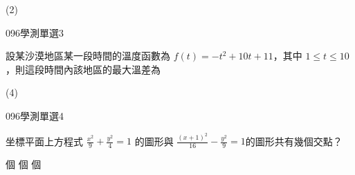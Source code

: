 \begin{QUESTIONS}
\begin{QUESTION}
        \begin{QANS}
            (2)
        \end{QANS}
        \begin{QSOLLIST}
        \end{QSOLLIST}
        \begin{QEMPTYSPACE}
        \end{QEMPTYSPACE}
    \end{QUESTION}
    \begin{QUESTION}
        \begin{ExamInfo}{096}{學測}{單選}{3}
        \end{ExamInfo}
        \begin{ExamAnsRateInfo}{58}{88}{62}{24}
        \end{ExamAnsRateInfo}
        \begin{QBODY}
			設某沙漠地區某一段時間的溫度函數為 $f(t) = -t^2 +10t +11$，其中 $1 \leq  t \leq 10$ ，則這段時間內該地區的最大溫差為
			\begin{QOPS} 
			\end{QOPS}
        \end{QBODY}
        \begin{QFROMS}
        \end{QFROMS}
        \begin{QTAGS}\end{QTAGS}
        \begin{QANS}
            (4)
        \end{QANS}
        \begin{QSOLLIST}
        \end{QSOLLIST}
        \begin{QEMPTYSPACE}
        \end{QEMPTYSPACE}
    \end{QUESTION}
    \begin{QUESTION}
        \begin{ExamInfo}{096}{學測}{單選}{4}
        \end{ExamInfo}
        \begin{ExamAnsRateInfo}{47}{78}{46}{17}
        \end{ExamAnsRateInfo}
        \begin{QBODY}
			坐標平面上方程式 $\frac{x^2}{9} + \frac{y^2}{4} =1$ 的圖形與 $\frac{(x+1)^2}{16} - \frac{y^2}{9}=1$的圖形共有幾個交點？ 
			\begin{QOPS} 
				\QOP 1 個 
				\QOP 2 個 
				\QOP 3 個


\end{QOPS}
\end{QBODY}
\end{QUESTION}
\end{QUESTIONS}
